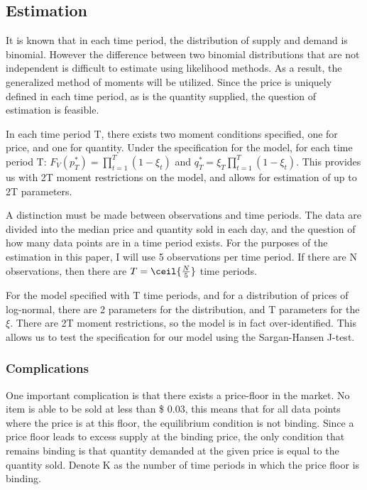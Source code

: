 \documentclass[12pt, letterpaper]{paper}
\begin{document}
\subsection{Estimation}
\label{sec-2-4}
It is known that in each time period, the distribution of supply and
demand is binomial. However the difference between two binomial
distributions that are not independent is difficult to estimate using
likelihood methods. As a result, the generalized method of moments
will be utilized. Since the price is uniquely defined in each time
period, as is the quantity supplied, the question of estimation is
feasible.

In each time period T, there exists two moment conditions specified,
one for price, and one for quantity. Under the specification for the
model, for each time period T: $F_V ( p_T^* ) = \prod_{t=1}^T ( 1 - \xi_t )$ and
$q_T^* = \xi_T \prod_{t=1}^T ( 1 - \xi_t )$. This provides us with 2T moment
restrictions on the model, and allows for estimation of up to 2T
parameters. 

A distinction must be made between observations and time
periods. The data are divided into the median price and quantity
sold in each day, and the question of how many data points are in a
time period exists. For the purposes of the estimation in this paper,
I will use 5 observations per time period. If there are N
observations, then there are $T = \ceil{ \frac{ N }{5} }$ time periods.

For the model specified with T time periods, and for a distribution of
prices of log-normal, there are 2 parameters for the distribution, and
T parameters for the $\xi$. There are 2T moment restrictions, so the model
is in fact over-identified. This allows us to test the specification
for our model using the Sargan-Hansen J-test.

\subsubsection{Complications}
\label{sec-2-4-1}

One important complication is that there exists a price-floor in the
market. No item is able to be sold at less than \$ 0.03, this means
that for all data points where the price is at this floor, the
equilibrium condition is not binding. Since a price floor leads to
excess supply at the binding price, the only condition that remains
binding is that quantity demanded at the given price is equal to the
quantity sold. Denote K as the number of time periods in which the
price floor is binding.
\end{document}
